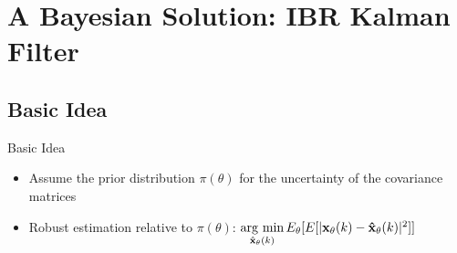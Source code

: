 \section{A Bayesian Solution: IBR Kalman Filter}
\begin{frame}
    \tableofcontents[currentsection]
\end{frame}

\subsection{Basic Idea}
\begin{frame}{Basic Idea}
    \begin{itemize}
        \item Assume the prior distribution $\pi(\theta)$ for the uncertainty of the covariance matrices
        \item Robust estimation relative to $\pi(\theta)$: $\mathop{\rm arg~min}\limits_{{\bf \hat x_\theta}(k)} E_\theta[E[|{\bf x_\theta}(k) - {\bf \hat x_\theta}(k)|^2]]$
    \end{itemize}
\end{frame}


